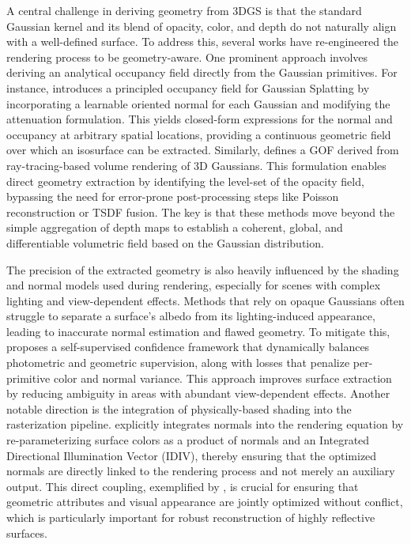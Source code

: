 \documentclass[11pt]{article}
\begin{document}
A central challenge in deriving geometry from 3DGS is that the standard Gaussian kernel and its blend of opacity, color, and depth do not naturally align with a well-defined surface. To address this, several works have re-engineered the rendering process to be geometry-aware. One prominent approach involves deriving an analytical occupancy field directly from the Gaussian primitives. For instance, \cite{ref22} introduces a principled occupancy field for Gaussian Splatting by incorporating a learnable oriented normal for each Gaussian and modifying the attenuation formulation. This yields closed-form expressions for the normal and occupancy at arbitrary spatial locations, providing a continuous geometric field over which an isosurface can be extracted. Similarly, \cite{ref211} defines a GOF derived from ray-tracing-based volume rendering of 3D Gaussians. This formulation enables direct geometry extraction by identifying the level-set of the opacity field, bypassing the need for error-prone post-processing steps like Poisson reconstruction or TSDF fusion. The key is that these methods move beyond the simple aggregation of depth maps to establish a coherent, global, and differentiable volumetric field based on the Gaussian distribution.

The precision of the extracted geometry is also heavily influenced by the shading and normal models used during rendering, especially for scenes with complex lighting and view-dependent effects. Methods that rely on opaque Gaussians often struggle to separate a surface's albedo from its lighting-induced appearance, leading to inaccurate normal estimation and flawed geometry. To mitigate this, \cite{ref212} proposes a self-supervised confidence framework that dynamically balances photometric and geometric supervision, along with losses that penalize per-primitive color and normal variance. This approach improves surface extraction by reducing ambiguity in areas with abundant view-dependent effects. Another notable direction is the integration of physically-based shading into the rasterization pipeline. \cite{ref213} explicitly integrates normals into the rendering equation by re-parameterizing surface colors as a product of normals and an Integrated Directional Illumination Vector (IDIV), thereby ensuring that the optimized normals are directly linked to the rendering process and not merely an auxiliary output. This direct coupling, exemplified by \cite{ref214}, is crucial for ensuring that geometric attributes and visual appearance are jointly optimized without conflict, which is particularly important for robust reconstruction of highly reflective surfaces.
\end{document}
